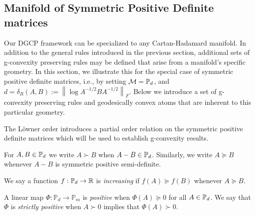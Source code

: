 \documentclass[twoside,11pt]{article}
\begin{document}
\subsection{Manifold of Symmetric Positive Definite matrices}\label{sec:rules}

Our DGCP framework can be specialized to any Cartan-Hadamard manifold. In addition to the general rules introduced in the previous section, additional sets of g-convexity preserving rules may be defined that arise from a manifold's specific geometry. In this section, we illustrate this for the special case of symmetric positive definite matrices, i.e., by setting $\mathcal{M} = \mathbb{P}_d$, and  $d = \delta_R(A, B):=\left\|\log A^{-1 / 2} B A^{-1 / 2}\right\|_F$. Below we introduce a set of g-convexity preserving rules and geodesically convex atoms that are inherent to this particular geometry.



The Löwner order introduces a partial order relation on the symmetric positive definite matrices which will be used to establish g-convexity results.
%
\begin{definition}\label{def:loewner_order}
    For $A ,B \in \mathbb{P}_d$ we write $A \succ B$ when $A - B \in \mathbb{P}_d$. Similarly, we write $A \succeq B$ whenever $A -B$ is symmetric positive semi-definite.
\end{definition}
%
We say a function $f: \mathbb{P}_d \rightarrow \mathbb{R}$ is \textit{increasing} if $f(A) \succeq f(B)$ whenever $A \succeq B$.
%


\begin{definition}
    A linear map $\Phi:\mathbb{P}_d \to \mathbb{P}_m$ is \textit{positive} when $\Phi(A) \succeq 0$ for all $A \in \mathbb{P}_d$. We say that $\Phi$ is \textit{strictly positive} when $A \succ 0$ implies that $\Phi(A) \succ 0$.
\end{definition}
%
\end{document}
